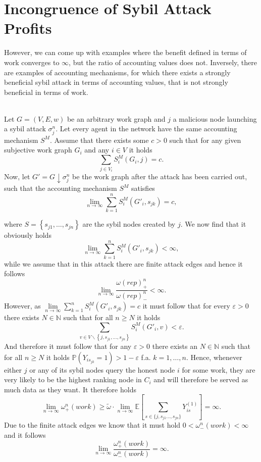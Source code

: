 \section{Incongruence of Sybil Attack Profits}
\label{sec:Incongruence of Sybil Attack Profits}
\noindent{}However, we can come up with examples where the benefit defined in terms of work converges to $\infty$, but the ratio of accounting values does not. Inversely, there are examples of accounting mechanisms, for which there exists a strongly beneficial sybil attack in terms of accounting values, that is not strongly beneficial in terms of work. \vspace{1em}\\

\begin{example}[]\ \\
\label{ex:Strongly Beneficial in Terms of Work, but not Reputation}
\noindent{}Let $G=(V,E,w)$ be an arbitrary work graph and $j$ a malicious node launching a sybil attack $\sigma^n_j$. Let every agent in the network have the same accounting mechanism $S^M$. Assume that there exists some $c>0$ such that for any given subjective work graph $G_i$ and any $i\in{}V$  it holds
\[
\sum\limits_{j\in{}V_i}S^M_i(G_i,j)=c.
\]
\noindent{}Now, let $G'=G\downarrow\sigma^n_j$ be the work graph after the attack has been carried out, such that the accounting mechanism $S^M$ satisfies 
\[
\lim\limits_{n\rightarrow\infty}\sum\limits_{k=1}^{n}S^M_i(G'_i,s_{jk})=c,
\]

\noindent{}where $S=\left\lbrace{}s_{j1},\ldots,s_{jn}\right\rbrace$ are the sybil nodes created by $j$. We now find that it obviously holds
\[
\lim\limits_{n\rightarrow\infty}\sum\limits_{k=1}^{n}S^M_i(G'_i,s_{jk})<\infty,
\]
while we assume that in this attack there are finite attack edges and hence it follows
\[
\lim\limits_{n\rightarrow\infty}\frac{\omega(rep)^n_{+}}{\omega(rep)^n_{-}}<\infty.
\]
However, as $\lim\limits_{n\rightarrow\infty}\sum\limits_{k=1}^{n}S^M_i(G'_i,s_{jk})=c$ it must follow that for every $\varepsilon>0$ there exists $N\in\mathbb{N}$ such that for all $n\geq{}N$ it holds 
\[
\sum\limits_{v\in{}V\backslash{}\left\lbrace{}j,s_{j1},\ldots,s_{jn}\right\rbrace}S^M_i(G'_i,v)<\varepsilon.
\]
\noindent{}And therefore it must follow that for any $\varepsilon>0$ there exists an $N\in\mathbb{N}$ such that for all $n\geq{}N$ it holds $\mathbb{P}(Y_{is_{jk}}=1)>1-\varepsilon$ f.a. $k=1,\ldots,n$. Hence, whenever either $j$ or any of its sybil nodes query the honest node $i$ for some work, they are very likely to be the highest ranking node in $C_i$ and will therefore be served as much data as they want. It therefore holds
\[
\lim\limits_{n\rightarrow\infty}\omega^n_{+}(work) \geq \tilde{\omega}\cdot{}\lim\limits_{n\rightarrow\infty}\mathbb{E}\left[\sum\limits_{s\in\lbrace{}j,s_{j1}\ldots,s_{jn}\rbrace}Y^{(1)}_{is}\right] = \infty.
\]
\noindent{}Due to the finite attack edges we know that it must hold $0< \omega^n_{-}(work) <\infty$ and it follows
\[
\lim\limits_{n\rightarrow\infty}\frac{\omega^n_{+}(work)}{\omega^n_{-}(work)}=\infty.
\]
\vspace{1em}\\


\end{example}

